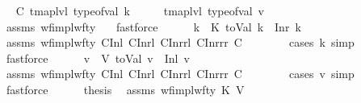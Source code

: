 \begin{isabellebody}
\ \isamarkupfalse%
\ C{\isacharcolon}{\kern0pt}\ {\isachardoublequoteopen}tmap{\isacharunderscore}{\kern0pt}lvl\ {\isacharparenleft}{\kern0pt}type{\isacharunderscore}{\kern0pt}of{\isacharunderscore}{\kern0pt}val\ k{\isacharparenright}{\kern0pt}\ {\isasymle}\ {}\ \ {\isasymand}\ \ tmap{\isacharunderscore}{\kern0pt}lvl\ {\isacharparenleft}{\kern0pt}type{\isacharunderscore}{\kern0pt}of{\isacharunderscore}{\kern0pt}val\ v{\isacharparenright}{\kern0pt}\ {\isacharequal}{\kern0pt}\ {}{\isachardoublequoteclose}\isanewline
\ \ \ \ \ \ \isamarkupfalse%
\ assms\ wf{\isacharunderscore}{\kern0pt}impl{\isacharunderscore}{\kern0pt}wf{\isacharunderscore}{\kern0pt}ty\ {\isachardoublequoteopen}{}{\isachardoublequoteclose}\ \isamarkupfalse%
\ fastforce\isanewline
\ \ \ \ \isamarkupfalse%
\ k{\isacharprime}{\kern0pt}\ \ K{\isacharcolon}{\kern0pt}\ {\isachardoublequoteopen}toVal{}{}{}{}\ k\ {\isacharequal}{\kern0pt}\ Inr\ k{\isacharprime}{\kern0pt}{\isachardoublequoteclose}\isanewline
\ \ \ \ \ \ \isamarkupfalse%
\ assms\ wf{\isacharunderscore}{\kern0pt}impl{\isacharunderscore}{\kern0pt}wf{\isacharunderscore}{\kern0pt}ty\ C{}Inl\ C{}Inrl\ C{}Inrrl\ C{}Inrrr\ C\isanewline
\ \ \ \ \ \ \isamarkupfalse%
\ {\isacharparenleft}{\kern0pt}cases\ k{\isacharsemicolon}{\kern0pt}\ simp{\isacharparenright}{\kern0pt}\ \isamarkupfalse%
\ fastforce\isanewline
\ \ \ \ \isamarkupfalse%
\ v{\isacharprime}{\kern0pt}\ \ V{\isacharcolon}{\kern0pt}\ {\isachardoublequoteopen}toVal{}{}{}{}\ v\ {\isacharequal}{\kern0pt}\ Inl\ v{\isacharprime}{\kern0pt}{\isachardoublequoteclose}\isanewline
\ \ \ \ \ \ \isamarkupfalse%
\ assms\ wf{\isacharunderscore}{\kern0pt}impl{\isacharunderscore}{\kern0pt}wf{\isacharunderscore}{\kern0pt}ty\ C{}Inl\ C{}Inrl\ C{}Inrrl\ C{}Inrrr\ C\isanewline
\ \ \ \ \ \ \isamarkupfalse%
\ {\isacharparenleft}{\kern0pt}cases\ v{\isacharsemicolon}{\kern0pt}\ simp{\isacharparenright}{\kern0pt}\ \isamarkupfalse%
\ fastforce\isanewline
\ \ \ \ \isamarkupfalse%
\ {\isacharquery}{\kern0pt}thesis\ \isamarkupfalse%
\ assms\ wf{\isacharunderscore}{\kern0pt}impl{\isacharunderscore}{\kern0pt}wf{\isacharunderscore}{\kern0pt}ty\ K\ V\ {\isachardoublequoteopen}{}{\isachardoublequoteclose}\ \isamarkupfalse%

\end{isabellebody}
